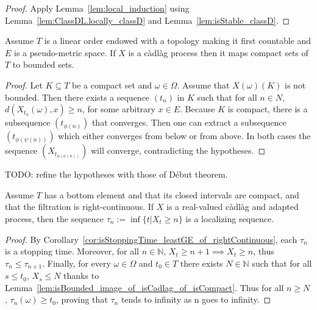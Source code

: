 \begin{proof}
  \leanok
Apply Lemma~\ref{lem:local_induction} using Lemma~\ref{lem:ClassDL.locally_classD} and Lemma~\ref{lem:isStable_classD}.
\end{proof}


\begin{lemma}\label{lem:isBounded_image_of_isCadlag_of_isCompact}
  \leanok
Assume $T$ is a linear order endowed with a topology making it first countable and $E$ is a pseudo-metric space. If $X$ is a càdlàg process then it maps compact sets of $T$ to bounded sets.
\end{lemma}

\begin{proof}\leanok
Let $K \subseteq T$ be a compact set and $\omega \in \Omega$. Assume that $X(\omega)(K)$ is not bounded. Then there exists a sequence $(t_n)$ in $K$ such that for all $n \in N$, $d(X_{t_n}(\omega), x) \ge n$, for some arbitrary $x \in E$. Because $K$ is compact, there is a subsequence $(t_{\phi(n)})$ that converges. Then one can extract a subsequence $(t_{\phi(\psi(n))})$ which either converges from below or from above. In both cases the sequence $(X_{t_{\phi(\psi(n))}})$ will converge, contradicting the hypotheses.
\end{proof}


TODO: refine the hypotheses with those of Début theorem.
\begin{lemma}\label{lem:isLocalizingSequence_leastGE}
  \leanok
Assume $T$ has a bottom element and that its closed intervals are compact, and that the filtration is right-continuous.
If $X$ is a real-valued càdlàg and adapted process, then the sequence $\tau_n := \inf \{t | X_t \ge n\}$ is a localizing sequence.
\end{lemma}

\begin{proof}
By Corollary~\ref{cor:isStoppingTime_leastGE_of_rightContinuous}, each $\tau_n$ is a stopping time. Moreover, for all $n \in \mathbb{N}$, $X_t \ge n+1 \implies X_t \ge n$, thus $\tau_n \le \tau_{n+1}$. Finally, for every $\omega \in \Omega$ and $t_0 \in T$ there exists $N \in \mathbb{N}$ such that for all $s \le t_0$, $X_s \le N$ thanks to Lemma~\ref{lem:isBounded_image_of_isCadlag_of_isCompact}. Thus for all $n \ge N$, $\tau_n(\omega) \ge t_0$, proving that $\tau_n$ tends to infinity as n goes to infinity.
\end{proof}


